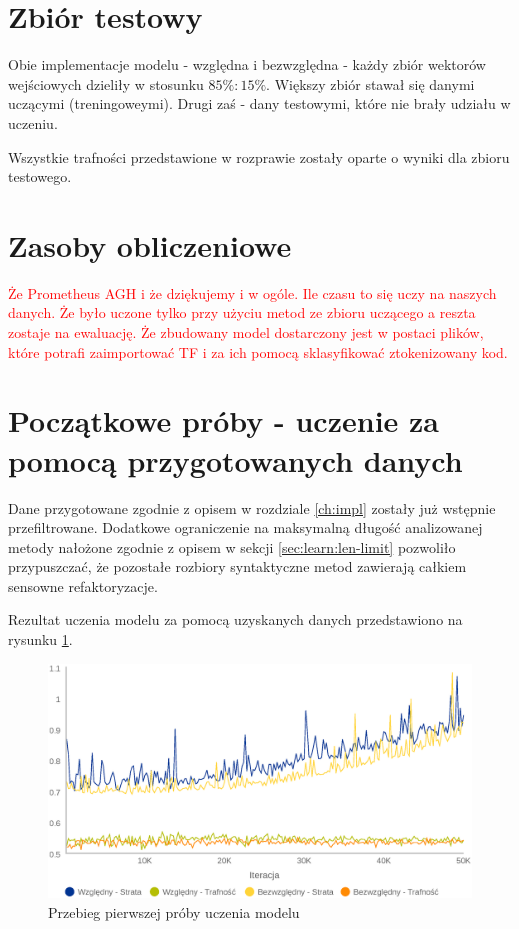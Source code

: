 \documentclass[12pt]{report}
\begin{document}
\section{Zbiór testowy}

Obie implementacje modelu - względna i bezwzględna - każdy zbiór wektorów wejściowych dzieliły w stosunku $85\%:15\%$. Większy zbiór stawał się danymi uczącymi (treningoweymi). Drugi zaś - dany testowymi, które nie brały udziału w uczeniu. 

Wszystkie trafności przedstawione w rozprawie zostały oparte o wyniki dla zbioru testowego.

\section{Zasoby obliczeniowe}
\textcolor{red}{Że Prometheus AGH i że dziękujemy i w ogóle. Ile czasu to się uczy na naszych danych. Że było uczone tylko przy użyciu metod ze zbioru uczącego a reszta zostaje na ewaluację. Że zbudowany model dostarczony jest w postaci plików, które potrafi zaimportować TF i za ich pomocą sklasyfikować ztokenizowany kod.}

\section{Początkowe próby - uczenie za pomocą przygotowanych danych}
Dane przygotowane zgodnie z opisem w rozdziale \ref{ch:impl} zostały już wstępnie przefiltrowane. Dodatkowe ograniczenie na maksymalną długość analizowanej metody nałożone zgodnie z opisem w sekcji \ref{sec:learn:len-limit} pozwoliło przypuszczać, że pozostałe rozbiory syntaktyczne metod zawierają całkiem sensowne  refaktoryzacje.

Rezultat uczenia modelu za pomocą uzyskanych danych przedstawiono na rysunku \ref{fig:learn:1st}.

\begin{figure}
\centering
\includegraphics[width=\textwidth]{learn/1st.eps}
\caption{Przebieg pierwszej próby uczenia modelu}
\label{fig:learn:1st}
\end{figure}
\end{document}
